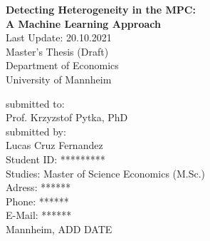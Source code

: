 \begin{titlepage}

\begin{center}

\vspace*{1,2cm}

\huge {\bfseries Detecting Heterogeneity in the MPC: \\ A Machine Learning Approach}\\[1.8cm]
\Large {Last Update: 20.10.2021}\\[1cm]

\Large {Master's Thesis (Draft)}\\[1cm]
\large {Department of Economics}\\[0.2cm]

\large {University of Mannheim}\\[0.5cm]

\end{center}

\vfill

\noindent submitted to:\\
Prof. Krzyzstof Pytka, PhD\\[1cm]
submitted by:\\
Lucas Cruz Fernandez\\[1cm]
Student ID: *********\\
Studies: Master of Science Economics (M.Sc.)\\[1cm]
Adress: ****** \\
Phone: ****** \\
E-Mail: ****** \\[1cm]
Mannheim, ADD DATE

\setcounter{page}{0}

\end{titlepage}
